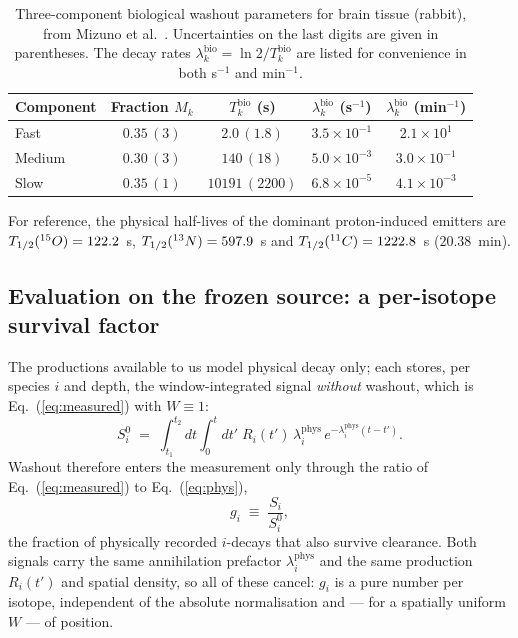 \documentclass[11pt]{article}
\newcommand{\iso}[2]{\textsuperscript{#1}#2}
\begin{document}
\begin{table}[ht]
  \centering
  \caption{Three-component biological washout parameters for brain tissue
  (rabbit), from Mizuno et al.~\cite{mizuno2003}. Uncertainties on the last
  digits are given in parentheses. The decay rates
  $\lambda_k^{\mathrm{bio}}=\ln2/T_k^{\mathrm{bio}}$ are listed for convenience
  in both s$^{-1}$ and min$^{-1}$.}
  \label{tab:washout_brain}
  \begin{tabular}{lcccc}
    \hline
    Component & Fraction $M_k$ & $T_k^{\mathrm{bio}}$ (s) &
      $\lambda_k^{\mathrm{bio}}$ (s$^{-1}$) &
      $\lambda_k^{\mathrm{bio}}$ (min$^{-1}$) \\
    \hline
    Fast   & $0.35\,(3)$ & $2.0\,(1.8)$    & $3.5\times10^{-1}$ & $2.1\times10^{1}$ \\
    Medium & $0.30\,(3)$ & $140\,(18)$     & $5.0\times10^{-3}$ & $3.0\times10^{-1}$ \\
    Slow   & $0.35\,(1)$ & $10191\,(2200)$ & $6.8\times10^{-5}$ & $4.1\times10^{-3}$ \\
    \hline
  \end{tabular}
\end{table}

For reference, the physical half-lives of the dominant proton-induced emitters
are $T_{1/2}(\iso{15}{O})=122.2$~s, $T_{1/2}(\iso{13}{N})=597.9$~s and
$T_{1/2}(\iso{11}{C})=1222.8$~s ($20.38$~min).

\subsection*{Evaluation on the frozen source: a per-isotope survival factor}

The productions available to us model physical decay only; each stores, per
species $i$ and depth, the window-integrated signal \emph{without} washout,
which is Eq.~(\ref{eq:measured}) with $W\!\equiv\!1$:
%
\begin{equation}
  S_i^{0} \;=\; \int_{t_1}^{t_2}\!\! dt \int_{0}^{t}\!\! dt'\;
  R_i(t')\,\lambda_i^{\mathrm{phys}}\,
  e^{-\lambda_i^{\mathrm{phys}}(t-t')}.
  \label{eq:phys}
\end{equation}
%
Washout therefore enters the measurement only through the ratio of
Eq.~(\ref{eq:measured}) to Eq.~(\ref{eq:phys}),
%
\begin{equation}
  g_i \;\equiv\; \frac{S_i}{S_i^{0}},
  \label{eq:gdef}
\end{equation}
%
the fraction of physically recorded $i$-decays that also survive clearance.
Both signals carry the same annihilation prefactor $\lambda_i^{\mathrm{phys}}$
and the same production $R_i(t')$ and spatial density, so all of these cancel:
$g_i$ is a pure number per isotope, independent of the absolute normalisation
and --- for a spatially uniform $W$ --- of position.
\end{document}
